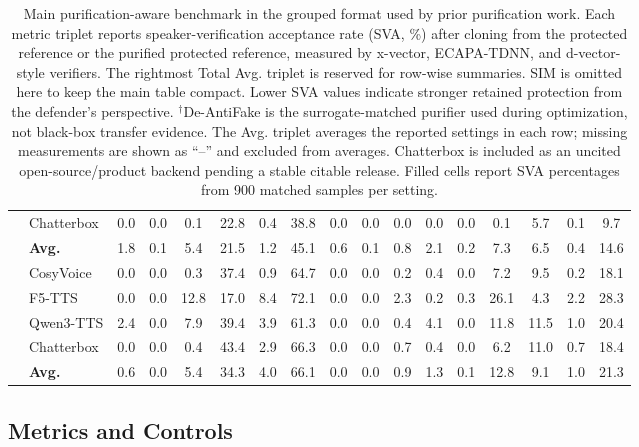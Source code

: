 \begin{table}[t]
\begin{tabular}{llccc@{\hspace{4pt}}ccc@{\hspace{4pt}}ccc@{\hspace{4pt}}ccc@{\hspace{4pt}}ccc}
& Chatterbox  & 0.0 & 0.0 & 0.1 & 22.8 & 0.4 & 38.8 & 0.0 & 0.0 & 0.0 & 0.0 & 0.0 & 0.1 & 5.7 & 0.1 & 9.7 \\
\rowcolor{avggray}
& \textbf{Avg.} & 1.8 & 0.1 & 5.4 & 21.5 & 1.2 & 45.1 & 0.6 & 0.1 & 0.8 & 2.1 & 0.2 & 7.3 & 6.5 & 0.4 & 14.6 \\
\methodspace
\midrule
\multirow{5}{*}{\method{}(8/255)}
& CosyVoice   & 0.0 & 0.0 & 0.3 & 37.4 & 0.9 & 64.7 & 0.0 & 0.0 & 0.2 & 0.4 & 0.0 & 7.2 & 9.5 & 0.2 & 18.1 \\
& F5-TTS      & 0.0 & 0.0 & 12.8 & 17.0 & 8.4 & 72.1 & 0.0 & 0.0 & 2.3 & 0.2 & 0.3 & 26.1 & 4.3 & 2.2 & 28.3 \\
& Qwen3-TTS   & 2.4 & 0.0 & 7.9 & 39.4 & 3.9 & 61.3 & 0.0 & 0.0 & 0.4 & 4.1 & 0.0 & 11.8 & 11.5 & 1.0 & 20.4 \\
& Chatterbox  & 0.0 & 0.0 & 0.4 & 43.4 & 2.9 & 66.3 & 0.0 & 0.0 & 0.7 & 0.4 & 0.0 & 6.2 & 11.0 & 0.7 & 18.4 \\
\rowcolor{avggray}
& \textbf{Avg.} & 0.6 & 0.0 & 5.4 & 34.3 & 4.0 & 66.1 & 0.0 & 0.0 & 0.9 & 1.3 & 0.1 & 12.8 & 9.1 & 1.0 & 21.3 \\
\midrule
\bottomrule
\end{tabular}
\caption{Main purification-aware benchmark in the grouped format used by prior purification work. 
Each metric triplet reports speaker-verification acceptance rate (SVA, \%) after cloning from the protected reference or the purified protected reference, measured by x-vector, ECAPA-TDNN, and d-vector-style verifiers. The rightmost Total Avg. 
triplet is reserved for row-wise summaries. SIM is omitted here to keep the main table compact. 
Lower SVA values indicate stronger retained protection from the defender's perspective. 
$^{\dagger}$De-AntiFake is the surrogate-matched purifier used during optimization, not black-box transfer evidence. 
The Avg. triplet averages the reported settings in each row; missing measurements are shown as ``--'' and excluded from averages. 
Chatterbox is included as an uncited open-source/product backend pending a stable citable release. 
Filled cells report SVA percentages from 900 matched samples per setting.}
\label{tab:main_reporting_template}
\end{table}

\subsection{Metrics and Controls}

